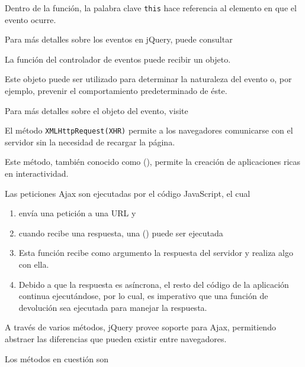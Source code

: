 Dentro de la función, la palabra clave \verb|this| hace referencia al elemento en que el evento ocurre.

Para más detalles sobre los eventos en jQuery, puede consultar 

La función del controlador de eventos puede recibir un objeto. 

Este objeto puede ser utilizado para determinar la naturaleza del
evento o, por ejemplo, prevenir el comportamiento predeterminado
de éste.

Para más detalles sobre el objeto del evento, visite 



El método \verb|XMLHttpRequest(XHR)| permite a los navegadores comunicarse con el servidor sin la necesidad de recargar la página. 

Este método, también conocido como  (), permite la creación de aplicaciones ricas en interactividad.

Las peticiones Ajax son ejecutadas por el código JavaScript, el cual 

\begin{enumerate}
\item 
envía una petición a una URL y 
\item 
cuando recibe una respuesta, una  () 
puede ser ejecutada 
\item 
Esta función recibe como argumento la respuesta del servidor y realiza algo con ella. 
\item 
Debido a que la respuesta es asíncrona, 
el resto del código de la aplicación continua ejecutándose, por lo cual, es imperativo que una función de devolución sea ejecutada para manejar la respuesta.
\end{enumerate}

A través de varios métodos, jQuery provee soporte para Ajax, 
permitiendo abstraer las diferencias que pueden existir entre navegadores. 

Los métodos en cuestión son 

